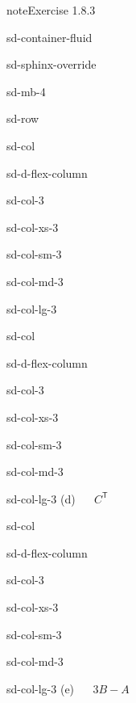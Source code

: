\documentclass[letterpaper,10pt,english]{jupyterBook}
\begin{document}
\begin{sphinxadmonition}{note}{Exercise 1.8.3}
\begin{sphinxuseclass}{sd-container-fluid}
\begin{sphinxuseclass}{sd-sphinx-override}
\begin{sphinxuseclass}{sd-mb-4}
\begin{sphinxuseclass}{sd-row}
\begin{sphinxuseclass}{sd-col}
\begin{sphinxuseclass}{sd-d-flex-column}
\begin{sphinxuseclass}{sd-col-3}
\begin{sphinxuseclass}{sd-col-xs-3}
\begin{sphinxuseclass}{sd-col-sm-3}
\begin{sphinxuseclass}{sd-col-md-3}
\begin{sphinxuseclass}{sd-col-lg-3}
\end{sphinxuseclass}
\end{sphinxuseclass}
\end{sphinxuseclass}
\end{sphinxuseclass}
\end{sphinxuseclass}
\end{sphinxuseclass}
\end{sphinxuseclass}
\begin{sphinxuseclass}{sd-col}
\begin{sphinxuseclass}{sd-d-flex-column}
\begin{sphinxuseclass}{sd-col-3}
\begin{sphinxuseclass}{sd-col-xs-3}
\begin{sphinxuseclass}{sd-col-sm-3}
\begin{sphinxuseclass}{sd-col-md-3}
\begin{sphinxuseclass}{sd-col-lg-3}
\sphinxAtStartPar
(d)   \(C^\mathsf{T}\)

\end{sphinxuseclass}
\end{sphinxuseclass}
\end{sphinxuseclass}
\end{sphinxuseclass}
\end{sphinxuseclass}
\end{sphinxuseclass}
\end{sphinxuseclass}
\begin{sphinxuseclass}{sd-col}
\begin{sphinxuseclass}{sd-d-flex-column}
\begin{sphinxuseclass}{sd-col-3}
\begin{sphinxuseclass}{sd-col-xs-3}
\begin{sphinxuseclass}{sd-col-sm-3}
\begin{sphinxuseclass}{sd-col-md-3}
\begin{sphinxuseclass}{sd-col-lg-3}
\sphinxAtStartPar
(e)   \(3B - A\)


\end{sphinxuseclass}
\end{sphinxuseclass}
\end{sphinxuseclass}
\end{sphinxuseclass}
\end{sphinxuseclass}
\end{sphinxuseclass}
\end{sphinxuseclass}
\end{sphinxuseclass}
\end{sphinxuseclass}
\end{sphinxuseclass}
\end{sphinxuseclass}
\end{sphinxadmonition}
\end{document}
